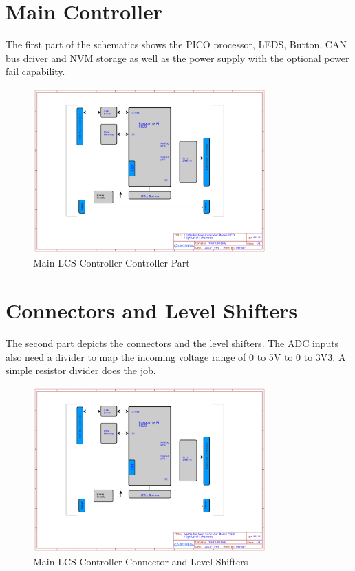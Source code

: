 \section{Main Controller}

The first part of the schematics shows the PICO processor, LEDS, Button, CAN bus driver and NVM storage as well as the power supply with the optional power fail capability.

\begin{figure}[htbp]
    \centering
    \includegraphics[page=2, width=0.8\textwidth]{./Schematics/Schematic_LcsNodes-Main-Controller-Board.pdf}
    \caption{Main LCS Controller Controller Part}
\end{figure}
\FloatBarrier

\section{Connectors and Level Shifters}

The second part depicts the connectors and the level shifters. The ADC inputs also need a divider to map the incoming voltage range of 0 to 5V to 0 to 3V3. A simple resistor divider does the job.

\begin{figure}[htbp]
    \centering
    \includegraphics[page=3, width=0.8\textwidth]{./Schematics/Schematic_LcsNodes-Main-Controller-Board.pdf}
    \caption{Main LCS Controller Connector and Level Shifters}
\end{figure}
\FloatBarrier


